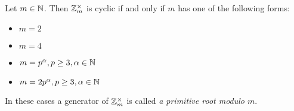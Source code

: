 \documentclass[NumTh.tex]{subfiles}
\begin{document}

\begin{cor}\label{cor_0_5_3}
  Let $m \in \mathbb{N}$. Then $\mathbb{Z}_m^\times$ is cyclic if and only if $m$ has one of the following forms:
  \begin{itemize}
    \item $m = 2$
    \item $m = 4$
    \item $m = p^\alpha, p \geq 3, \alpha \in \mathbb{N}$
    \item $m = 2 p^\alpha, p \geq 3, \alpha \in \mathbb{N}$
  \end{itemize}
\end{cor}

In these cases a generator of $\mathbb{Z}_m^\times$ is called \emph{a primitive root modulo $m$}.
\end{document}
